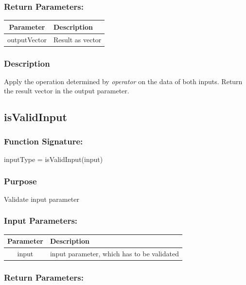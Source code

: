 \documentclass[a4]{scrreprt}
\begin{document}
\subsubsection{Return Parameters:}

\begin{longtabu} to \textwidth {|c|X|}
	\hline
	\textbf{Parameter} & \textbf{Description} \\ \hline
	\endhead
	outputVector & Result as vector \\ \hline
\end{longtabu}

\subsubsection{Description}

Apply the operation determined by \textit{operator} on the data of both inputs. Return the result vector in the output parameter.

\subsection{isValidInput}

\subsubsection{Function Signature:}

\begin{center}
	inputType = isValidInput(input)
\end{center}

\subsubsection{Purpose}

Validate input parameter

\subsubsection{Input Parameters:}

\begin{longtabu} to \textwidth {|c|X|}
	\hline
	\textbf{Parameter} & \textbf{Description} \\ \hline
	\endhead
	input & input parameter, which has to be validated \\ \hline
\end{longtabu}

\subsubsection{Return Parameters:}
\end{document}
